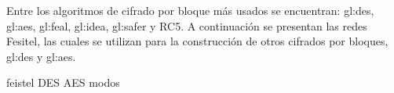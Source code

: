 Entre los algoritmos de cifrado por bloque más usados se encuentran:
\gls{gl:des}, \gls{gl:aes}, \gls{gl:feal}, \gls{gl:idea}, \gls{gl:safer}
y RC5. A continuación se presentan las redes Fesitel, las cuales se utilizan
para la construcción de otros cifrados por bloques, \gls{gl:des} y \gls{gl:aes}.

{feistel}
{DES}
{AES}
{modos}
